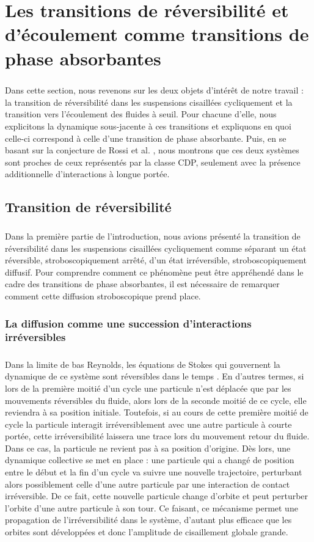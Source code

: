 \section{Les transitions de réversibilité et d'écoulement comme transitions de phase absorbantes}

\subparagraph{}Dans cette section, nous revenons sur les deux objets d'intérêt de notre travail : la transition de réversibilité dans les suspensions cisaillées cycliquement et la transition vers l'écoulement des fluides à seuil. Pour chacune d'elle, nous explicitons la dynamique sous-jacente à ces transitions et expliquons en quoi celle-ci correspond à celle d'une transition de phase absorbante. Puis, en se basant sur la conjecture de Rossi et al. \cite{rossi_universality_2000}, nous montrons que ces deux systèmes sont proches de ceux représentés par la classe CDP, seulement avec la présence additionnelle d'interactions à longue portée.

\subsection{Transition de réversibilité}

\subparagraph{}Dans la première partie de l'introduction, nous avions présenté la transition de réversibilité dans les suspensions cisaillées cycliquement comme séparant un état réversible, stroboscopiquement arrêté, d'un état irréversible, stroboscopiquement diffusif. Pour comprendre comment ce phénomène peut être appréhendé dans le cadre des transitions de phase absorbantes, il est nécessaire de remarquer comment cette diffusion stroboscopique prend place.

\subsubsection{La diffusion comme une succession d'interactions irréversibles}


\subparagraph{}Dans la limite de bas Reynolds, les équations de Stokes qui gouvernent la dynamique de ce système sont réversibles dans le temps \cite{kimMicrohydrodynamicsPrinciplesSelected1991}. En d'autres termes, si lors de la première moitié d'un cycle une particule n'est déplacée que par les mouvements réversibles du fluide, alors lors de la seconde moitié de ce cycle, elle reviendra à sa position initiale. Toutefois, si au cours de cette première moitié de cycle la particule interagit irréversiblement avec une autre particule à courte portée, cette irréversibilité laissera une trace lors du mouvement retour du fluide. Dans ce cas, la particule ne revient pas à sa position d'origine. Dès lors, une dynamique collective se met en place : une particule qui a changé de position entre le début et la fin d'un cycle va suivre une nouvelle trajectoire, perturbant alors possiblement celle d'une autre particule par une interaction de contact irréversible. De ce fait, cette nouvelle particule change d'orbite et peut perturber l'orbite d'une autre particule à son tour. Ce faisant, ce mécanisme permet une propagation de l'irréversibilité dans le système, d'autant plus efficace que les orbites sont développées et donc l'amplitude de cisaillement globale grande.

